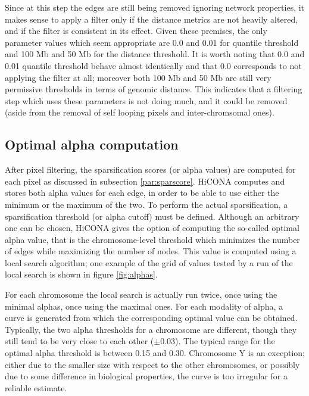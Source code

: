 Since at this step the edges are still being removed ignoring network properties, it makes sense to apply a filter only if the distance metrics are not heavily altered, and if the filter is consistent in its effect. Given these premises, the only parameter values which seem appropriate are 0.0 and 0.01 for quantile threshold and 100 Mb and 50 Mb for the distance threshold. It is worth noting that 0.0 and 0.01 quantile threshold behave almost identically and that 0.0 corresponds to not applying the filter at all; moreover both 100 Mb and 50 Mb are still very permissive thresholds in terms of genomic distance. This indicates that a filtering step which uses these parameters is not doing much, and it could be removed (aside from the removal of self looping pixels and inter-chromsomal ones).

\subsection{Optimal alpha computation}

After pixel filtering, the sparsification scores (or alpha values) are computed for each pixel as discussed in subsection \ref{par:sparscore}. HiCONA computes and stores both alpha values for each edge, in order to be able to use either the minimum or the maximum of the two. To perform the actual sparsification, a sparsification threshold (or alpha cutoff) must be defined. Although an arbitrary one can be chosen, HiCONA gives the option of computing the so-called optimal alpha value, that is the chromosome-level threshold which minimizes the number of edges while maximizing the number of nodes. This value is computed using a local search algorithm; one example of the grid of values tested by a run of the local search is shown in figure \ref{fig:alphas}.

For each chromosome the local search is actually run twice, once using the minimal alphas, once using the maximal ones. For each modality of alpha, a curve is generated from which the corresponding optimal value can be obtained. Typically, the two alpha thresholds for a chromosome are different, though they still tend to be very close to each other ($\pm 0.03$). The typical range for the optimal alpha threshold is between 0.15 and 0.30. Chromosome Y is an exception; either due to the smaller size with respect to the other chromosomes, or possibly due to some difference in biological properties, the curve is too irregular for a reliable estimate. 

